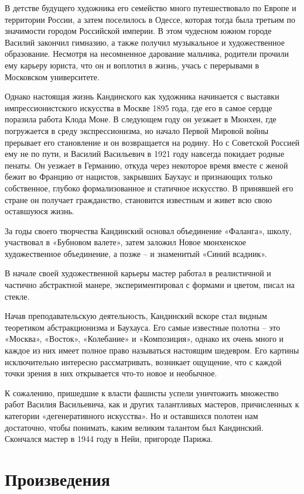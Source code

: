 В детстве будущего художника его семейство много путешествовало по Европе и территории России, а затем поселилось в Одессе, которая тогда была третьим по значимости городом Российской империи. В этом чудесном южном городе Василий закончил гимназию, а также получил музыкальное и художественное образование. Несмотря на несомненное дарование мальчика, родители прочили ему карьеру юриста, что он и воплотил в жизнь, учась с перерывами в Московском университете.

Однако настоящая жизнь Кандинского как художника начинается с выставки импрессионистского искусства в Москве 1895 года, где его в самое сердце поразила работа Клода Моне. В следующем году он уезжает в Мюнхен, где погружается в среду экспрессионизма, но начало Первой Мировой войны прерывает его становление и он возвращается на родину. Но с Советской Россией ему не по пути, и Василий Васильевич в 1921 году навсегда покидает родные пенаты. Он уезжает в Германию, откуда через некоторое время вместе с женой бежит во Францию от нацистов, закрывших Баухаус и признающих только собственное, глубоко формализованное и статичное искусство. В принявшей его стране он получает гражданство, становится известным и живет всю свою оставшуюся жизнь.

За годы своего творчества Кандинский основал объединение «Фаланга», школу, участвовал в «Бубновом валете», затем заложил Новое мюнхенское художественное объединение, а позже -- и знаменитый «Синий всадник».

В начале своей художественной карьеры мастер работал в реалистичной и частично абстрактной манере, экспериментировал с формами и цветом, писал на стекле.

Начав преподавательскую деятельность, Кандинский вскоре стал видным теоретиком абстракционизма и Баухауса. Его самые известные полотна -- это «Москва», «Восток», «Колебание» и «Композиция», однако их очень много и каждое из них имеет полное право называться настоящим шедевром. Его картины исключительно интересно рассматривать, возникает ощущение, что с каждой точки зрения в них открывается что-то новое и необычное.

К сожалению, пришедшие к власти фашисты успели уничтожить множество работ Василия Васильевича, как и других талантливых мастеров, причисленных к категории «дегенеративного искусства». Но и оставшихся полотен нам достаточно, чтобы понимать, каким великим талантом был Кандинский. Скончался мастер в 1944 году в Нейи, пригороде Парижа.


\section{Произведения}
